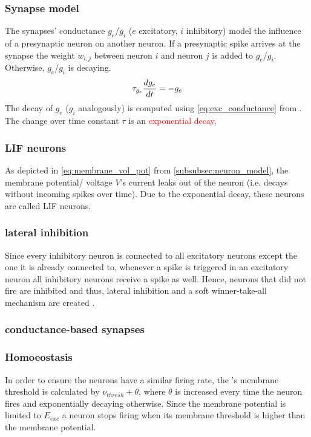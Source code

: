 \subsubsection{Synapse model}
\label{subsubsec:synapse_model}
The synapses' conductance $g_e$/$g_i$ ($e$ excitatory, $i$ inhibitory) model the influence of a presynaptic neuron on another neuron.
If a presynaptic spike arrives at the synapse the weight $w_{i,j}$ between neuron $i$ and neuron $j$ is added to $g_e$/$g_i$.
Otherwise, $g_e$/$g_i$ is decaying.
%
\begin{equation}
    \centering
    \label{eq:exc_conductance}
    \tau_{g_e} \frac{dg_e}{dt} = - g_e
\end{equation}
%
The decay of $g_e$ ($g_i$ analogously) is computed using \autoref{eq:exc_conductance} from \cite{SNN}.
The change over time constant $\tau$ is an \textcolor{red}{exponential decay}.


\subsubsection{\ac{LIF} neurons}
As depicted in \autoref{eq:membrane_vol_pot} from \autoref{subsubsec:neuron_model}, the membrane potential/ voltage $V$'s current leaks out of the neuron 
(i.e. decays without incoming spikes over time).
Due to the exponential decay, these neurons are called \ac{LIF} neurons.


\subsubsection{lateral inhibition}
Since every inhibitory neuron is connected to all excitatory neurons except the one it is already connected to, 
whenever a spike is triggered in an excitatory neuron all inhibitory neurons receive a spike as well.
Hence, neurons that did not fire are inhibited and thus, lateral inhibition and a soft winner-take-all mechanism are created \cite{SNN}.


\subsubsection{conductance-based synapses}


\subsubsection{Homoeostasis}
In order to ensure the neurons have a similar firing rate, the \eN{}'s membrane threshold is calculated by $\nu_{thresh} + \theta$, 
where $\theta$ is increased every time the neuron fires and exponentially decaying otherwise.
Since the membrane potential is limited to $E_{exc}$ a neuron stops firing when its membrane threshold is higher than the membrane potential.

